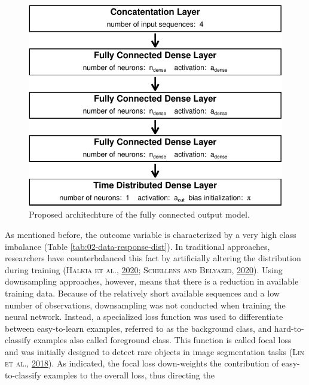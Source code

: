 \documentclass[a4paper,11pt]{article}
\begin{document}
\newpage
\begin{figure}[H]

{\centering \includegraphics{thesis_files/figure-latex/03-methods-fc-1} 

}

\caption{Proposed architechture of the fully connected output model.}\label{fig:03-methods-fc}
\end{figure}
As mentioned before, the outcome variable is characterized by a very high
class imbalance (Table \ref{tab:02-data-response-dist}). In traditional approaches,
researchers have counterbalanced this fact by artificially altering the distribution
during training \textsc{(\textnormal{\textsc{Halkia} \textsc{et al.}}, \textnormal{\protect\hyperlink{ref-halkia2020a}{2020}}; \textnormal{\textsc{Schellens} and \textsc{Belyazid}}, \textnormal{\protect\hyperlink{ref-schellens2020}{2020}})}. Using downsampling approaches,
however, means that there is a reduction in available training data. Because of
the relatively short available sequences and a low number of observations,
downsampling was not conducted when training the neural network. Instead, a
specialized loss function was used to differentiate between easy-to-learn examples,
referred to as the background class, and hard-to-classify examples also called foreground class.
This function is called focal loss and was initially designed to detect rare objects in
image segmentation tasks \textsc{(\textnormal{\textsc{Lin} \textsc{et al.}}, \textnormal{\protect\hyperlink{ref-lin2018}{2018}})}. As indicated, the focal loss down-weights the
contribution of easy-to-classify examples to the overall loss, thus directing the
\end{document}
